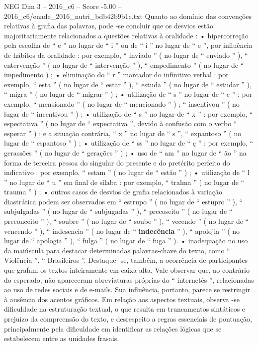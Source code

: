 \begin{textsample}{NEG Dim 3 – 2016\_c6 – Score -5.00 – 2016\_c6/enade\_2016\_nutri\_bdb42b9b1c.txt}
Quanto ao domínio das convenções relativas à grafia das palavras, pode -se concluir que os desvios estão majoritariamente relacionados a questões relativas à oralidade : • hipercorreção pela escolha de “ e ” no lugar de “ i ” ou de “ i ” no lugar de “ e ”, por influência de hábitos da oralidade : por exemplo, “ inviado ” ( no lugar de “ enviado ” ), “ entervenção ” ( no lugar de “ intervenção ” ), “ empedimento ” ( no lugar de “ impedimento ) ; • eliminação do “ r ” marcador do infinitivo verbal : por exemplo, “ esta ” ( no lugar de “ estar ” ), “ estuda ” ( no lugar de “ estudar ” ), “ migra ” ( no lugar de “ migrar ” ) ; • utilização de “ s ” no lugar de “ c ” : por exemplo, “ mensionado ” ( no lugar de “ mencionado ” ) ; “ insentivou ” ( no lugar de “ incentivou ” ) ; • utilização de “ s ” no lugar de “ x ” : por exemplo, “ espectativa ” ( no lugar de “ expectativa ”, devido à confusão com o verbo “ esperar ” ) ; e a situação contrária, “ x ” no lugar de “ s ”, “ expantoso ” ( no lugar de “ espantoso ” ) ; • utilização de “ ss ” no lugar de “ ç ” : por exemplo, “ gerassões ” ( no lugar de “ gerações ” ) ; • uso de “ am ” no lugar de “ ão ” na forma de terceira pessoa do singular do presente e do pretérito perfeito do indicativo : por exemplo, “ estam ” ( no lugar de “ estão ” ) ; • utilização de “ l ” no lugar de “ u ” em final de sílaba : por exemplo, “ tralma ” ( no lugar de “ trauma ” ) ; • outros casos de desvios de grafia relacionados à variação diastrática podem ser observados em “ estrupo ” ( no lugar de “ estupro ” ), “ subjulgadas ” ( no lugar de “ subjugadas ” ), “ precoseito ” ( no lugar de “ preconceito ” ), “ soubre ” ( no lugar de “ soube ” ), “ vecendo ” ( no lugar de “ vencendo ” ), “ indesencia ” ( no lugar de “ \textbf{indecência} ” ), “ apolojia ” ( no lugar de “ apologia ” ), “ fulga ” ( no lugar de “ fuga ” ). • inadequação no uso da maiúscula para destacar determinadas palavras-chave do texto, como “ Violência ”, “ Brasileiros ”.
Destaque -se, também, a ocorrência de participantes que grafam os textos inteiramente em caixa alta.
Vale observar que, ao contrário do esperado, não apareceram abreviaturas próprias do “ internetês ”, relacionadas ao uso de redes sociais e de e-mails.
Sua influência, portanto, parece se restringir à ausência dos acentos gráficos.
Em relação aos aspectos textuais, observa -se dificuldade na estruturação textual, o que resulta em truncamentos sintáticos e prejuízo da compreensão do texto, e desrespeito a regras essenciais de pontuação, principalmente pela dificuldade em identificar as relações lógicas que se estabelecem entre as unidades frasais.

\end{textsample}
